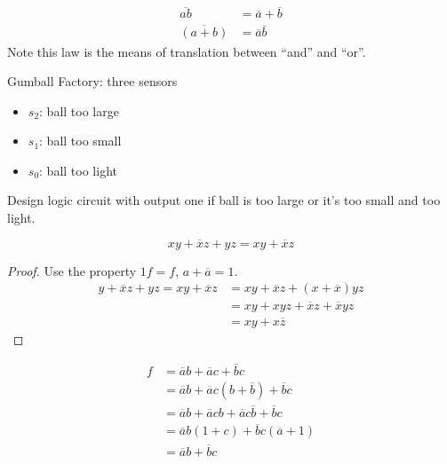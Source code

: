 \documentclass[a4paper, 10pt]{article}
\numberwithin{equation}{section}
\begin{document}
\begin{proposition}
    \begin{align}
        \overline{ab}&=\overline{a} + \overline{b}\\
        \overline{(a+b)}&=\overline{a}\overline{b}
    \end{align}
    Note this law is the means of translation between ``and'' and ``or''.
\end{proposition}
\begin{example}
    Gumball Factory: three sensors \begin{itemize}
        \item $s_2$: ball too large
        \item $s_1$: ball too small
        \item $s_0$: ball too light
    \end{itemize}
    \begin{center}
    \end{center}
    Design logic circuit with output one if ball is too large or it's too small and too light.
\end{example}

\begin{theorem}[Consensus]
    \begin{equation}
        xy+\overline{x}z+yz=xy+\overline{x}z
    \end{equation}
    \begin{proof}
        Use the property $1f=f$, $a+\overline{a}=1$.
        \begin{align}
            y+\overline{x}z+yz=xy+\overline{x}z&=xy+\overline{x}z+(x+\overline{x})yz\\
            &=xy+xyz+\overline{x}z+\overline{x}yz\\
            &=xy+x\overline{z}
        \end{align}
    \end{proof}
\end{theorem}

\begin{example}
    \begin{align}
        f&=\overline a b+\overline a c+\overline b c\\
        &=\overline ab+\overline ac(b+\overline b)+\overline bc\\
        &=\overline ab+\overline acb+\overline ac\overline b+\overline bc\\
        &=\overline ab(1+c)+\overline bc(\overline a+1)\\
        &=\overline ab+\overline bc
    \end{align}
\end{example}
\end{document}
